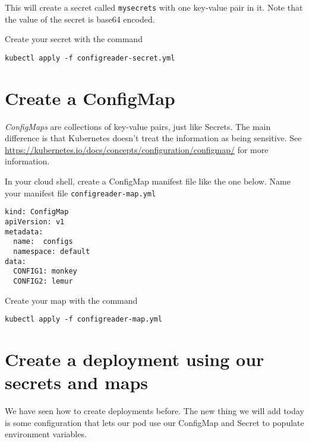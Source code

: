 \documentclass{article}
\begin{document}
This will create a secret called \texttt{mysecrets} with one key-value pair in it. Note that the value of the secret is base64 encoded.

Create your secret with the command
\begin{verbatim}
kubectl apply -f configreader-secret.yml
\end{verbatim}


\section{Create a ConfigMap}
\emph{ConfigMaps} are collections of key-value pairs, just like Secrets. The main difference is that Kubernetes doesn't treat the information as being sensitive. See \url{https://kubernetes.io/docs/concepts/configuration/configmap/} for more information.

In your cloud shell, create a ConfigMap manifest file like the one below.
Name your manifest file \texttt{configreader-map.yml}

\begin{verbatim}
kind: ConfigMap
apiVersion: v1
metadata:
  name:  configs
  namespace: default
data:
  CONFIG1: monkey
  CONFIG2: lemur
\end{verbatim}

Create your map with the command
\begin{verbatim}
kubectl apply -f configreader-map.yml
\end{verbatim}

\section{Create a deployment using our secrets and maps}
We have seen how to create deployments before. The new thing we will add today is some configuration that lets our pod use our ConfigMap and Secret to populate environment variables.
\end{document}
